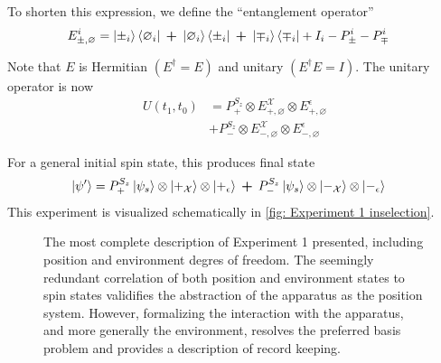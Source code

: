 To shorten this expression, we define the ``entanglement operator''
\begin{align}
  E^i_{\pm, \varnothing} &= \ket{\pm_i}\bra{\varnothing_i} \: \bm{+} \: \ket{\varnothing_i}\bra{\pm_i} \: \bm{+} \: \ket{\mp_i}\bra{\mp_i} + I_i - P^i_\pm - P^i_\mp
\end{align}

Note that $E$ is Hermitian $\left(E^\dagger = E\right)$ and unitary $\left( E^\dagger E = I \right)$. The unitary operator is now
\begin{align}  \label{einselection experiment 1}
  U(t_1, t_0) &= P^{S_z}_+ \otimes E^\mathcal{X}_{+, \varnothing} \otimes E^\epsilon_{+,\varnothing} \\ \nonumber
  &+ P^{S_z}_- \otimes E^\mathcal{X}_{-, \varnothing} \otimes E^\epsilon_{-, \varnothing}
\end{align}

For a general initial spin state, this produces final state
\begin{align}
  \ket{\psi'} &= P^{S_z}_+ \ket{\psi_s} \otimes \ket{+_{\mathcal{X}}} \otimes \ket{+_\epsilon} \: \bm{+} \: P^{S_z}_- \ket{\psi_s} \otimes \ket{-_{\mathcal{X}}} \otimes \ket{-_\epsilon}
\end{align}
This experiment is visualized schematically in \autoref{fig: Experiment 1 inselection}.

\begin{figure}
\centering\CaptionFontSize
{}
\caption[Insert an abbreviated caption here to show in the List of Figures]
{The most complete description of Experiment 1 presented, including position and environment degres of freedom. The seemingly redundant correlation of both position and environment states to spin states validifies the abstraction of the apparatus as the position system. However, formalizing the interaction with the apparatus, and more generally the environment, resolves the preferred basis problem and provides a description of record keeping.}
\label{fig: Experiment 1 inselection}
\end{figure}

